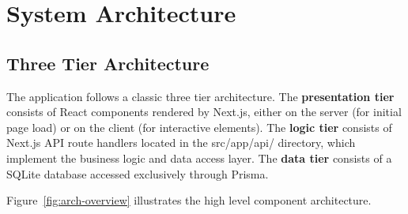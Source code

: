 \section{System Architecture}

\subsection{Three Tier Architecture}

The application follows a classic three tier architecture. The \textbf{presentation tier} consists of React components rendered by Next.js, either on the server (for initial page load) or on the client (for interactive elements). The \textbf{logic tier} consists of Next.js API route handlers located in the src/app/api/ directory, which implement the business logic and data access layer. The \textbf{data tier} consists of a SQLite database accessed exclusively through Prisma.

Figure~\ref{fig:arch-overview} illustrates the high level component architecture.

